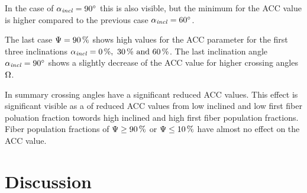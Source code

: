In the case of $\textnormal{$\alpha_{\mathit{incl}}$}=\SI{90}{\degree}$ this is also visible, but the minimum for the \ac{ACC} value is higher compared to the previous case $\textnormal{$\alpha_{\mathit{incl}}$}=\SI{60}{\degree}$.
\par
%
The last case $\textnormal{$\Psi$}=\SI{90}{\percent}$ shows high values for the \ac{ACC} parameter for the first three inclinations $\modelInc=\SIlist{0;30;60}{\percent}$.
The last inclination angle $\textnormal{$\alpha_{\mathit{incl}}$}=\SI{90}{\degree}$ shows a slightly decrease of the \ac{ACC} value for higher crossing angles $\textnormal{$\Omega$}$.
\par
%
In summary crossing angles have a significant reduced \ac{ACC} values.
This effect is significant visible as a  of reduced \ac{ACC} values from low inclined and low first fiber poluation fraction towords high inclined and high first fiber population fractions.
Fiber population fractions of $\textnormal{$\Psi$} \geq \SI{90}{\percent}$ or $\textnormal{$\Psi$} \leq \SI{10}{\percent}$ have almost no effect on the \ac{ACC} value.
%
%
% 
\section{Discussion}
%

